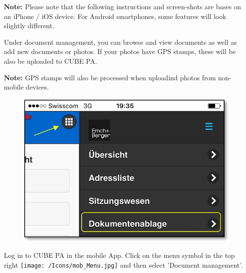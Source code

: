 \vspace{\baselineskip}

\textbf{Note:} Please note that the following instructions and screen-shots are bases on an iPhone / iOS device. For Android smartphones, some features will look slightly different.

\vspace{\baselineskip}

Under document management, you can browse and view documents as well as add new documents or photos. If your photos have GPS stamps, these will be also be uploaded to CUBE PA.

\vspace{\baselineskip}

\textbf{Note:} GPS stamps will also be processed when uploadind photos from non-mobile devices.

\vspace{\baselineskip}

\begin{figure}   %
  \vspace{-35pt}      %
  \begin{center}
    \includegraphics[width=1\linewidth]{../chapters/11_Dokumentenablage/pictures/11-mob01_Dokumentenablage_oeffnen.jpg}
  \end{center}
  \vspace{-20pt}
  \vspace{-10pt}
\end{figure}

Log in to CUBE PA in the mobile App. Click on the menu symbol in the top right \texttt{[image: /Icons/mob\_Menu.jpg]} and then select 'Document management'.

